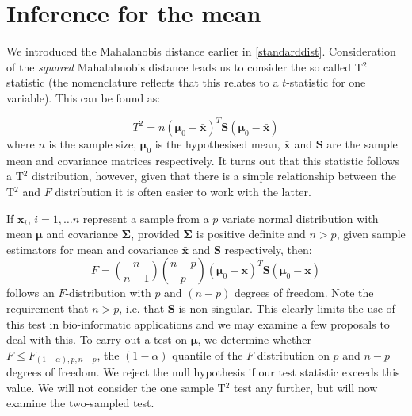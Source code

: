 \chapter{Inference for the mean}
\label{meaninf}


We introduced the Mahalanobis distance earlier in \ref{standarddist}.   Consideration of the \emph{squared} Mahalabnobis distance leads us to consider the so called T$^{2}$ statistic (the nomenclature reflects that this relates to a $t$-statistic for one variable). This can be found as:

\begin{equation}
\label{t2}
T^{2} = n (\boldsymbol{\mu}_{0} - \bar{\boldsymbol{x}})^{T} \boldsymbol{S}  (\boldsymbol{\mu}_{0} - \bar{\boldsymbol{x}})
\end{equation}
where $n$ is the sample size, $\boldsymbol{\mu}_{0}$ is the hypothesised mean, $\bar{\boldsymbol{x}}$ and $\boldsymbol{S}$ are the sample mean and covariance matrices respectively.    It turns out that this statistic follows a T$^{2}$ distribution, however, given that there is a simple relationship between the T$^{2}$ and $F$ distribution it is often easier to work with the latter.


If $\boldsymbol{x}_{i}$, $i = 1, \ldots n$ represent a sample from a $p$ variate normal distribution with mean $\boldsymbol{\mu}$ and covariance $\boldsymbol{\Sigma}$, provided $\boldsymbol{\Sigma}$ is positive definite and $n > p$, given sample estimators for mean and covariance $\bar{\boldsymbol{x}}$ and $\boldsymbol{S}$ respectively, then:
\begin{equation}
F = \left(\frac{n}{n-1}\right) \left(\frac{n-p}{p}\right)  (\boldsymbol{\mu}_{0} - \bar{\boldsymbol{x}})^{T} \boldsymbol{S}  (\boldsymbol{\mu}_{0} - \bar{\boldsymbol{x}})
\end{equation}
follows an $F$-distribution with $p$ and $(n-p)$ degrees of freedom.   Note the requirement that $n > p$, i.e. that $\boldsymbol{S}$ is non-singular.   This clearly limits the use of this test in bio-informatic applications and we may examine a few proposals to deal with this.   To carry out a test on $\boldsymbol{\mu}$, we determine whether $F \leq F_{(1-\alpha),p,n-p}$, the $(1-\alpha)$ quantile of the $F$ distribution on $p$ and $n-p$ degrees of freedom.   We reject the null hypothesis if our test statistic exceeds this value.   We will not consider the one sample T$^{2}$ test any further, but will now examine the two-sampled test.


